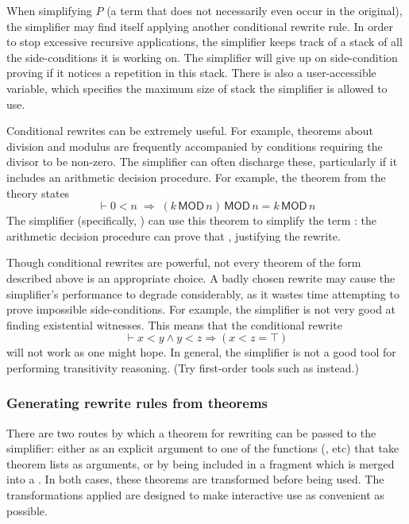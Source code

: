 When simplifying $P$ (a term that does not necessarily even occur in
the original), the simplifier may find itself applying another
conditional rewrite rule.  In order to stop excessive recursive
applications, the simplifier keeps track of a stack of all the
side-conditions it is working on.  The simplifier will give up on
side-condition proving if it notices a repetition in this stack.
There is also a user-accessible variable, 
which specifies the maximum size of stack the simplifier is allowed to
use.

Conditional rewrites can be extremely useful.  For example, theorems
about division and modulus are frequently accompanied by conditions
requiring the divisor to be non-zero.  The simplifier can often
discharge these, particularly if it includes an arithmetic decision
procedure.  For example, the theorem  from the theory
 states
\[
\vdash 0 < n \;\Rightarrow \; (k\,\textsf{MOD}\,n)\,\textsf{MOD}\,n = k
\,\textsf{MOD}\,n
\]
The simplifier (specifically, )
can use this theorem to simplify the term
: the arithmetic decision
procedure can prove that , justifying the rewrite.

Though conditional rewrites are powerful, not every theorem of the
form described above is an appropriate choice.  A badly chosen rewrite
may cause the simplifier's performance to degrade considerably, as it
wastes time attempting to prove impossible side-conditions.  For
example, the simplifier is not very good at finding existential
witnesses.  This means that the conditional rewrite \[
\vdash x < y \land y < z \Rightarrow (x < z = \top)
\]
will not work as one might hope.  In general, the simplifier is not a
good tool for performing transitivity reasoning.  (Try first-order
tools such as  instead.)

\subsubsection{Generating rewrite rules from theorems}
\label{sec:generating-rewrite-rules}

There are two routes by which a theorem for rewriting can be passed to
the simplifier: either as an explicit argument to one of the \ML{}
functions (,  etc) that take theorem
lists as arguments, or by being included in a \simpset{} fragment
which is merged into a \simpset.  In both cases, these theorems are
transformed before being used.  The transformations applied are
designed to make interactive use as convenient as possible.


